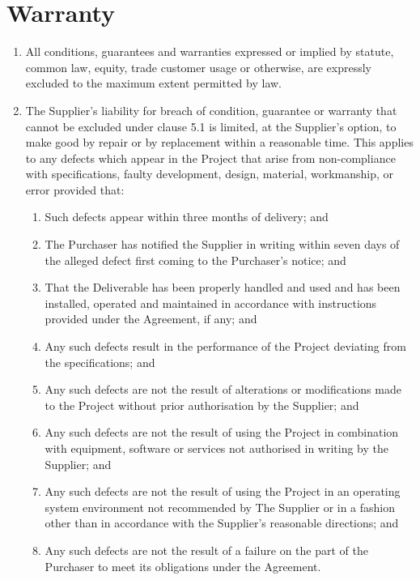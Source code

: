 \documentclass[nz-terms]{subfiles}
\begin{document}
\section{Warranty}

\begin{enumerate}
\item All conditions, guarantees and warranties expressed or implied by statute,
common law, equity, trade customer usage or otherwise, are expressly excluded
to the maximum extent permitted by law.
\item The Supplier's liability for breach of condition, guarantee or warranty
that cannot be excluded under clause 5.1 is limited, at the Supplier's
option, to make good by repair or by replacement within a reasonable time.
This applies to any defects which appear in the Project that arise from
non-compliance with specifications, faulty development, design, material,
workmanship, or error provided that:
    \begin{enumerate}
    \item Such defects appear within three months of delivery; and
    \item The Purchaser has notified the Supplier in writing within seven days
    of the alleged defect first coming to the Purchaser's notice; and
    \item That the Deliverable has been properly handled and used and has been
    installed, operated and maintained in accordance with instructions
    provided under the Agreement, if any; and
    \item Any such defects result in the performance of the Project deviating
    from the specifications; and
    \item Any such defects are not the result of alterations or modifications
    made to the Project without prior authorisation by the Supplier; and
    \item Any such defects are not the result of using the Project in
    combination with equipment, software or services not authorised in
    writing by the Supplier; and
    \item Any such defects are not the result of using the Project in an
    operating system environment not recommended by The Supplier or in a
    fashion other than in accordance with the Supplier's reasonable
    directions; and
    \item Any such defects are not the result of a failure on the part of the
    Purchaser to meet its obligations under the Agreement.
    \end{enumerate}

\end{enumerate}
\end{document}
